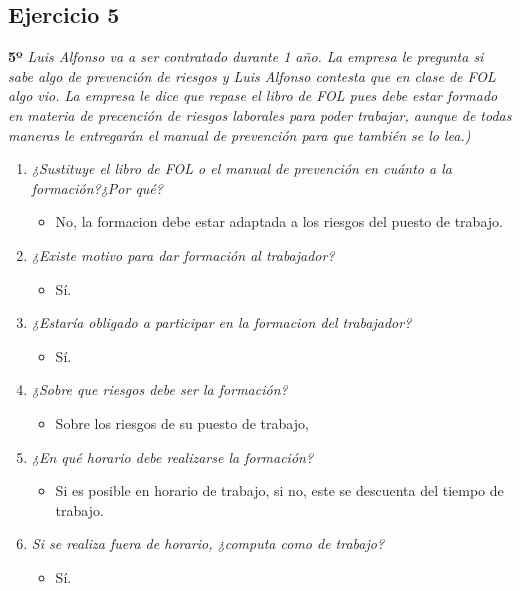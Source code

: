 \documentclass{article}
\begin{document}
      \subsection{Ejercicio 5}
        \textbf{5º} \textit{Luis Alfonso va a ser contratado durante 1 año. La empresa le pregunta si sabe algo de prevención de riesgos y Luis Alfonso contesta que en clase de FOL algo vio. La empresa le dice que repase el 
        libro de FOL pues debe estar formado en materia de precención de riesgos laborales para poder trabajar, aunque de todas maneras le entregarán el manual de prevención para que también se lo lea.)}
        \\
        \begin{enumerate}[label=(\alph*)]
          \item \textit{¿Sustituye el libro de FOL o el manual de prevención en cuánto a la formación?¿Por qué?}
            \begin{itemize}
              \item No, la formacion debe estar adaptada a los riesgos del puesto de trabajo.
            \end{itemize}
          \item \textit{¿Existe motivo para dar formación al trabajador?}
            \begin{itemize}
              \item Sí.
            \end{itemize}
          \item \textit{¿Estaría obligado a participar en la formacion del trabajador?}
            \begin{itemize}
              \item Sí.
            \end{itemize}
          \item \textit{¿Sobre que riesgos debe ser la formación?}
            \begin{itemize}
              \item Sobre los riesgos de su puesto de trabajo,
            \end{itemize}
          \item \textit{¿En qué horario debe realizarse la formación?}
            \begin{itemize}
              \item Si es posible en horario de trabajo, si no, este se descuenta del tiempo de trabajo.
            \end{itemize}
          \item \textit{Si se realiza fuera de horario, ¿computa como de trabajo?}
            \begin{itemize}
              \item Sí.
            \end{itemize}
        \end{enumerate}
      \newpage
\end{document}
